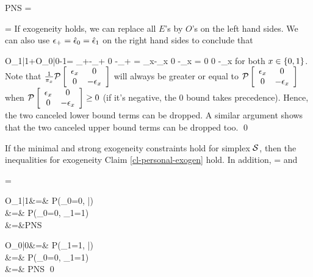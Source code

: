 \beq
PNS =
\eeq

\beq
\left[
\begin{array}{c}
E_{1|1}
\\
\\
E_{0|0}
\\
\\
O_{1,1}+ O_{0,0}
\\
\\
E_{1|1} + E_{0|0}
-O_{1,1}- O_{0,0}
\end{array}
\right]
=
\eeq
If exogeneity holds,
we can replace all $E$'s
by $O$'s on the left hand sides.
We can also use $\epsilon_+=\hat{\epsilon}_0=
\hat{\epsilon}_1$ 
on the right hand sides to conclude that

\beq
O_{1|1}+O_{0|0}-1=
\Pmat{\eps_+}
{\eps_+-\eps_+}
{0}
{-\eps_+}
=
{\hat{\eps}_x-\hat{\eps}_x}
{0}
{-\hat{\eps}_x}
=
{0}
{0}
{-\eps_x}
\eeq
for both $x\in\{0,1\}$.
Note that
$\frac{1}{\pi_x}{\cal P}\left[ \begin{array}{cc}\epsilon_x&0\\0&-\epsilon_x \end{array}\right]$
will always be greater or equal to
${\cal P}\left[ \begin{array}{cc}\epsilon_x&0\\0&-\epsilon_x \end{array}\right]$
when ${\cal P}\left[ \begin{array}{cc}\epsilon_x&0\\0&-\epsilon_x \end{array}\right]\geq 0$ (if it's 
negative, the 0 bound takes precedence). Hence,
the two canceled lower bound terms
can be dropped.
A similar argument shows that the
two canceled upper bound terms
can be dropped too.
\qed



\begin{claim}
If the minimal and 
strong exogeneity constraints
 hold for simplex ${\cal S}$,
then the inequalities 
for exogeneity Claim \ref{cl-personal-exogen}
hold.
In addition,
\beq
\PN =
\eeq
and

\beq
\PS =
\eeq
\end{claim}
\proof
\beqa
\PN *O_{1|1}&=&
P(\rvy_0=0, |)
\\
&=&
P(\rvy_0=0, \rvy_1=1)
\\
&=&PNS
\eeqa

\beqa
\PS *O_{0|0}&=&
P(\rvy_1=1, |)
\\
&=&
P(\rvy_0=0, \rvy_1=1)
\\
&=& PNS
\eeqa
\qed


